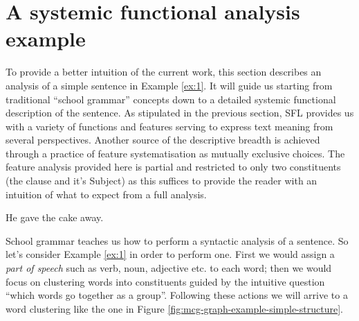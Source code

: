     
\section{A systemic functional analysis example}
\label{sec:example}
    To provide a better intuition of the current work, this section describes an analysis of a simple sentence in Example \ref{ex:1}. It will guide us starting from traditional ``school grammar'' concepts down to a detailed systemic functional description of the sentence. %
    As stipulated in the previous section, SFL provides us with a variety of functions and features serving to express text meaning from several perspectives. Another source of the descriptive breadth is achieved through a practice of feature systematisation as mutually exclusive choices. %
    The feature analysis provided here is partial and restricted to only two constituents (the clause and it's Subject) as this suffices to provide the reader with an intuition of what to expect from a full analysis.
    
    \begin{exe}
        \ex\label{ex:1} He gave the cake away.
    \end{exe}
    
    School grammar teaches us how to perform a syntactic analysis of a sentence. So let's consider Example \ref{ex:1} in order to perform one. First we would assign a \textit{part of speech} such as verb, noun, adjective etc. to each word; then we would focus on clustering words into constituents guided by the intuitive question ``which words go together as a group''. Following these actions we will arrive to a word clustering like the one in Figure \ref{fig:mcg-graph-example-simple-structure}.
    
